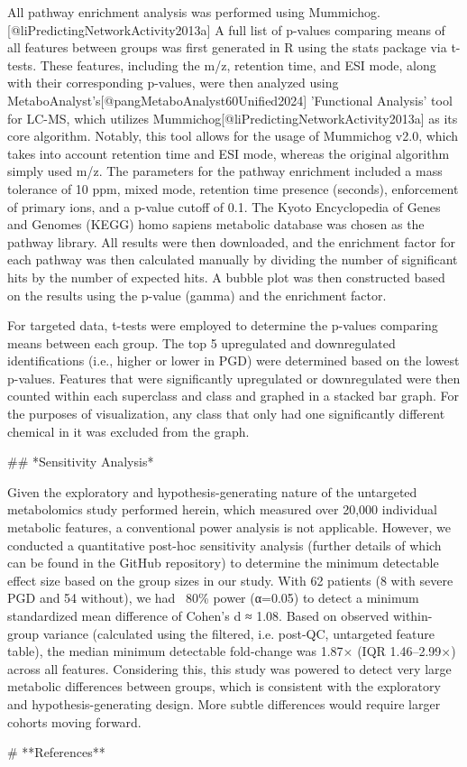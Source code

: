 All pathway enrichment analysis was performed using Mummichog.[@liPredictingNetworkActivity2013a] A full list of p-values comparing means of all features between groups was first generated in R using the stats package via t-tests. These features, including the m/z, retention time, and ESI mode, along with their corresponding p-values, were then analyzed using MetaboAnalyst's[@pangMetaboAnalyst60Unified2024] 'Functional Analysis' tool for LC-MS, which utilizes Mummichog[@liPredictingNetworkActivity2013a] as its core algorithm. Notably, this tool allows for the usage of Mummichog v2.0, which takes into account retention time and ESI mode, whereas the original algorithm simply used m/z. The parameters for the pathway enrichment included a mass tolerance of 10 ppm, mixed mode, retention time presence (seconds), enforcement of primary ions, and a p-value cutoff of 0.1. The Kyoto Encyclopedia of Genes and Genomes (KEGG) homo sapiens metabolic database was chosen as the pathway library. All results were then downloaded, and the enrichment factor for each pathway was then calculated manually by dividing the number of significant hits by the number of expected hits. A bubble plot was then constructed based on the results using the p-value (gamma) and the enrichment factor.

For targeted data, t-tests were employed to determine the p-values comparing means between each group. The top 5 upregulated and downregulated identifications (i.e., higher or lower in PGD) were determined based on the lowest p-values. Features that were significantly upregulated or downregulated were then counted within each superclass and class and graphed in a stacked bar graph. For the purposes of visualization, any class that only had one significantly different chemical in it was excluded from the graph.

## *Sensitivity Analysis*

Given the exploratory and hypothesis-generating nature of the untargeted metabolomics study performed herein, which measured over 20,000 individual metabolic features, a conventional power analysis is not applicable. However, we conducted a quantitative post-hoc sensitivity analysis (further details of which can be found in the GitHub repository) to determine the minimum detectable effect size based on the group sizes in our study. With 62 patients (8 with severe PGD and 54 without), we had ~80\% power (α=0.05) to detect a minimum standardized mean difference of Cohen's d ≈ 1.08. Based on observed within-group variance (calculated using the filtered, i.e. post-QC, untargeted feature table), the median minimum detectable fold-change was 1.87× (IQR 1.46–2.99×) across all features. Considering this, this study was powered to detect very large metabolic differences between groups, which is consistent with the exploratory and hypothesis-generating design. More subtle differences would require larger cohorts moving forward.

\newpage

# **References**